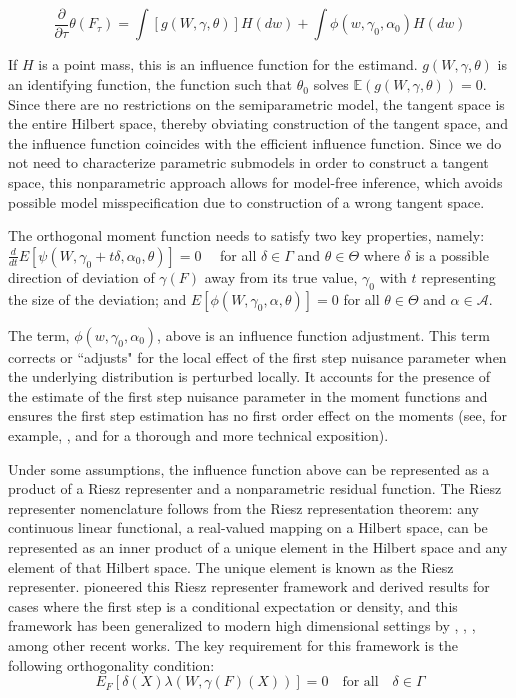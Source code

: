 $$
\frac{\partial}{\partial \tau} \theta\left(F_\tau\right)=\int\left[g (W, \gamma, \theta)\right] H(d w)+\int \phi\left(w, \gamma_0, \alpha_0\right) H(d w)$$

If $H$ is a point mass, this is an influence function for the estimand. $g (W, \gamma, \theta)$ is an identifying function, the function such that $\theta_0$ solves $\mathbb{E}(g (W, \gamma, \theta))=0$. Since there are no restrictions on the semiparametric model, the  tangent space is the entire Hilbert space, thereby obviating construction of the tangent space, and the influence function coincides with the efficient influence function. Since we do not need to characterize parametric submodels in order to construct a tangent space, this nonparametric approach allows for model-free inference, which avoids possible model misspecification due to construction of a wrong tangent space. 

The orthogonal moment function needs to satisfy two key properties, namely: $\frac{d}{d t} E\left[\psi\left(W, \gamma_0+t \delta, \alpha_0, \theta\right)\right]=0 \quad$ for all $\delta \in \Gamma$ and $\theta \in \Theta$ where $\delta$ is a possible direction of deviation of $\gamma(F)$ away from its true value, $\gamma_0$ with $t$ representing the size of the deviation; and $E\left[\phi\left(W, \gamma_0, \alpha, \theta\right)\right]=0$ for all $\theta \in \Theta$ and $\alpha \in \mathcal{A}$. 

The term, $\phi\left(w, \gamma_0, \alpha_0\right)$, above is an influence function adjustment. This term corrects or ``adjusts" for the local effect of the first step nuisance parameter when the underlying distribution is perturbed locally. It accounts for the presence of the estimate of the first step nuisance parameter in the moment functions and ensures the first step estimation has no first order effect on the moments (see, for example, \citet{ichimura2022influence}, \citet{chernozhukov2021automatic} \citet{chernozhukov2022debiased} and \citet{chernozhukov2022locally} for a thorough and more technical exposition).

Under some assumptions, the influence function above can be represented as a product of a Riesz representer and a nonparametric residual function. The Riesz representer nomenclature follows from the Riesz representation theorem: any continuous linear functional, a real-valued mapping on a Hilbert space, can be represented as an inner product of a unique element in the Hilbert space and any element of that Hilbert space. The unique element is known as the Riesz representer. \citet{newey1994asymptotic} pioneered this Riesz representer framework and derived results for cases where the first step is a conditional expectation or density, and this framework has been generalized to modern high dimensional settings by \citet{chernozhukov2022locally}, \citet{ichimura2022influence}, \citet{chernozhukov2024automatic}, among other recent works. The key requirement for this framework is the following orthogonality condition:
\begin{equation} \label{eq1}
E_F[\delta(X) \lambda(W, \gamma(F)(X))]=0 \quad \text{for all} \quad \delta \in \Gamma
\end{equation}
 
